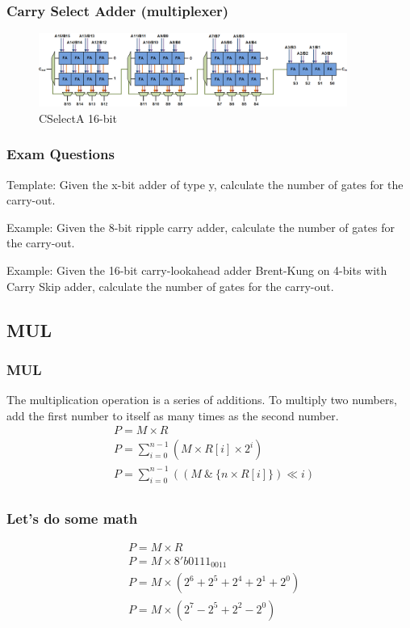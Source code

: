 \begin{frame}
    \frametitle{Carry Select Adder (multiplexer)}
    \begin{figure}
        \centering
        \includegraphics[width=0.9\textwidth]{media/Carry-select-adder-fixed-size.png}
        \caption{CSelectA 16-bit}
    \end{figure}
\end{frame}

\begin{frame}
    \frametitle{Exam Questions}
 Template: Given the x-bit adder of type y, calculate the number of gates for the carry-out.

 Example: Given the 8-bit ripple carry adder, calculate the number of gates for the carry-out.

 Example: Given the 16-bit carry-lookahead adder Brent-Kung on 4-bits with Carry Skip adder, calculate the number of gates for the carry-out.
\end{frame}

\subsection{MUL}

\begin{frame}
    \frametitle{MUL}
 The multiplication operation is a series of additions. To multiply two numbers,
 add the first number to itself as many times as the second number.
    \begin{equation}
        \begin{aligned}
            &P = M \times R\\
            &P=\sum_{i=0}^{n-1} (M \times R[i] \times 2^i)\\
            &P=\sum_{i=0}^{n-1} ((M \ \& \ \{n \times R[i]\}) \ll i)\\
        \end{aligned}
    \end{equation}
\end{frame}

\begin{frame}
    \frametitle{Let's do some math}
    \begin{equation}
        \begin{aligned}
            &P = M \times R\\
            &P = M \times 8'b0111_0011\\
            &P = M \times (2^6 + 2^5 + 2^4 + 2^1 + 2^0)\\
            &P = M \times (2^7 - 2^5 + 2^2 - 2^0)\\
        \end{aligned}
    \end{equation}
\end{frame}

